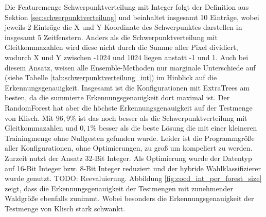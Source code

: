 Die Featuremenge Schwerpunktverteilung mit Integer folgt der Definition aus Sektion \ref{sec:schwerpunktverteilung} und beinhaltet insgesamt 10 Einträge, wobei jeweils 2 Einträge die X und Y
Koordinate des Schwerpunktes darstellen in insgesamt 5 Zeitfenstern. Anders als die Schwerpunktverteilung mit Gleitkommazahlen wird diese nicht durch die Summe aller Pixel dividiert, wodurch
X und Y zwischen -1024 und 1024 liegen anstatt -1 und 1.
\newline
\newline
Auch bei diesem Ansatz, weisen alle Ensemble-Methoden nur marginale Unterschiede auf (siehe Tabelle \ref{tab:schwerpunktverteilung_int}) im Hinblick auf die Erkennungsgenauigkeit. Insgesamt ist
die Konfigurationen mit ExtraTrees am besten, da die summierte Erkennungsgenauigkeit dort maximal ist. Der RandomForest hat aber die höchste Erkennungsgenauigkeit auf der Testmenge von Klisch.
Mit $96,9\%$ ist das noch besser als die Schwerpunktverteilung mit Gleitkommazahlen und $0,1\%$ besser als die beste Lösung die mit einer kleineren Trainingmenge ohne Nullgesten gefunden wurde.
\newline
\newline
Leider ist die Programmgröße aller Konfigurationen, ohne Optimierungen, zu groß um kompeliert zu werden. Zurzeit nutzt der Ansatz 32-Bit Integer. Als Optimierung wurde der Datentyp auf 16-Bit
Integer bzw. 8-Bit Integer reduziert und der hybride Wahlklassifizierer wurde genutzt. TODO: Reevaluierung.
\newline
\newline
Abbildung \ref{fig:cocd_int_per_forest_size} zeigt, dass die Erkennungsgenauigkeit der Testmengen mit zunehmender Waldgröße ebenfalls zunimmt. Wobei besonders die Erkennungsgenauigkeit der
Testmenge von Klisch stark schwankt.
